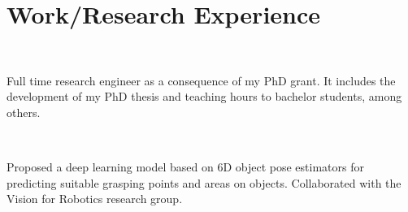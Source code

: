 \documentclass[]{deedy-resume-openfont}
\begin{document}
\begin{minipage}[t]{0.495\textwidth} 



\section{Work/Research Experience}

 \\
\vspace{\topsep} %
\begin{tightemize}
	\item Full time research engineer as a consequence of my PhD grant. It includes the development of my PhD thesis and teaching hours to bachelor students, among others.
\end{tightemize}

\sectionsep

 \\
\begin{tightemize}
	\item Proposed a deep learning model based on 6D object pose estimators for predicting suitable grasping points and areas on objects. Collaborated with the Vision for Robotics research group.
\end{tightemize}

\sectionsep

%


\end{minipage}
\end{document}
